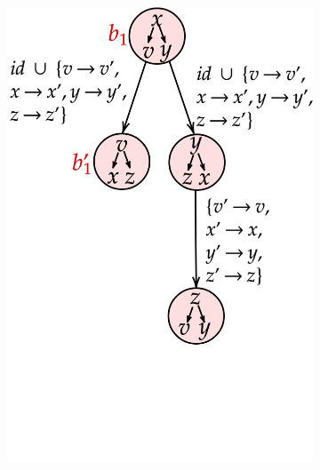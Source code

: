 \documentclass{beamer}
\newenvironment{figure*}%
{\begin{figure}}
{\end{figure}}
\begin{document}
{\begin{center}
\begin{figure}
\begin{subfigure}{0.5\textwidth}
 			\includegraphics[scale=0.15]{figs/netys/decomp2.png}
 		\end{subfigure}
 	\end{figure}
 	\end{center}
}
\end{document}
